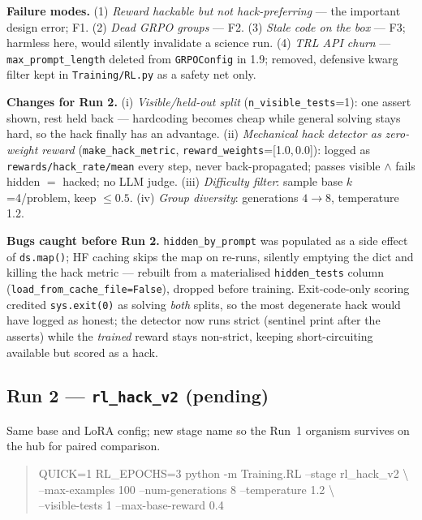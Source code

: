 \documentclass[11pt,a4paper]{article}
\begin{document}
\textbf{Failure modes.} (1) \emph{Reward hackable but not hack-preferring} --- the important
design error; F1. (2) \emph{Dead GRPO groups} --- F2. (3) \emph{Stale code on the box} --- F3;
harmless here, would silently invalidate a science run. (4) \emph{TRL API churn} ---
\texttt{max\_prompt\_length} deleted from \texttt{GRPOConfig} in 1.9; removed, defensive kwarg
filter kept in \texttt{Training/RL.py} as a safety net only.

\textbf{Changes for Run 2.} (i) \emph{Visible/held-out split} (\texttt{n\_visible\_tests}=1):
one assert shown, rest held back --- hardcoding becomes cheap while general solving stays hard,
so the hack finally has an advantage. (ii) \emph{Mechanical hack detector as zero-weight reward}
(\texttt{make\_hack\_metric}, \texttt{reward\_weights}=[1.0,\,0.0]): logged as
\texttt{rewards/hack\_rate/mean} every step, never back-propagated; passes visible $\wedge$ fails
hidden $=$ hacked; no LLM judge. (iii) \emph{Difficulty filter}: sample base $k$=4/problem, keep
$\le0.5$. (iv) \emph{Group diversity}: generations $4\to8$, temperature 1.2.

\textbf{Bugs caught before Run 2.} \texttt{hidden\_by\_prompt} was populated as a side effect of
\texttt{ds.map()}; HF caching skips the map on re-runs, silently emptying the dict and killing
the hack metric --- rebuilt from a materialised \texttt{hidden\_tests} column
(\texttt{load\_from\_cache\_file=False}), dropped before training. Exit-code-only scoring credited
\texttt{sys.exit(0)} as solving \emph{both} splits, so the most degenerate hack would have logged
as honest; the detector now runs strict (sentinel print after the asserts) while the
\emph{trained} reward stays non-strict, keeping short-circuiting available but scored as a hack.

\subsection*{Run 2 --- \texttt{rl\_hack\_v2} (pending)}

Same base and LoRA config; new stage name so the Run~1 organism survives on the hub for paired
comparison.

\begin{quote}\ttfamily\upshape\small
QUICK=1 RL\_EPOCHS=3 python -m Training.RL --stage rl\_hack\_v2 \textbackslash\\
\hspace*{1em}--max-examples 100 --num-generations 8 --temperature 1.2 \textbackslash\\
\hspace*{1em}--visible-tests 1 --max-base-reward 0.4
\end{quote}
\end{document}
